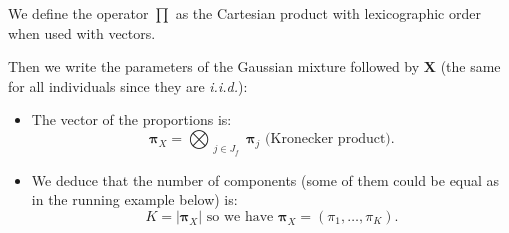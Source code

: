 \documentclass[12pt,a4paper]{report}
\begin{document}
We define the operator $\prod$ as the Cartesian product with lexicographic order when used with vectors. \\
	
	
	Then we write the parameters of the Gaussian mixture followed by $\boldsymbol{X}$ (the same for all individuals since they are {\it i.i.d.}):
\begin{itemize}
	\item The vector of the proportions is:
	\begin{equation}
		\boldsymbol{\pi}_X=\bigotimes_{\substack{j \in J_f }} \boldsymbol{\pi}_j \textrm{ (Kronecker product)}.  \nonumber 
	\end{equation}
	\item We deduce that the number of components (some of them could be equal as in the running example below) is:
	\begin{equation}
		K=|\boldsymbol{\pi}_X| \textrm{ so we have } \boldsymbol{\pi}_X=(\pi_1,\dots,\pi_K). \nonumber 
	\end{equation}
	\end{itemize}
\end{document}
